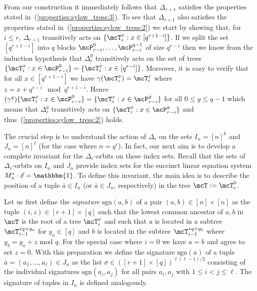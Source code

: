 \documentclass[a4paper,UKenglish]{lipics}
\newcommand{\defeq}{:=}
\newcommand{\inseg}[1]{\ensuremath{[#1]}}
\newcommand{\sgn}{\ensuremath{\textrm{sgn}}}
\newcommand{\modulo}{\ensuremath{\text{mod }}}
\newcommand{\onevec}{\ensuremath{\mathbbm{1}}}
\newcommand{\ba}{{\bar a}}
\theoremstyle{plain}
\begin{document}
\medskip
From our construction it immediately follows that $\Delta_{r+1}$ satisfies the
properties stated in~(\ref{properties:sylow_tress:3}). To see that
$\Delta_{r+1}$ also satisfies the properties stated
in~(\ref{properties:sylow_tress:2}) we start by showing that, for $i \leq r$, 
$\Delta_{r+1}$ transitively acts on $\{\mcT_i^x : x \in \inseg {q^{r+1-i}} \}$.
If we split the set $\inseg {q^{r+1-i}}$  
into $q$ blocks $\mcP_{r-i}^0, \dots, \mcP_{r-i}^{q-1}$ of size $q^{r-i}$
then we know from the induction hypothesis that $\Delta_{r}^0$ transitively
acts on the set of trees $\{ \mcT_i^x : x \in \mcP_{r-i}^0 \} = \{
\mcT_i^x : x \in \inseg {q^{r-i}} \}$. 
Moreover, it is easy to verify that for all $x \in \inseg{q^{r+1-i}}$ we have
$\gamma(\mcT_i^x) = \mcT_i^z$ where $z = {x + q^{r-i} \mod q^{r+1-i}}$.
Hence $(\gamma^y) \{ \mcT_i^x : x \in \mcP_{r-i}^0 \} = \{ \mcT_i^x : x \in
\mcP_{r-i}^y \}$ for all $0 \leq y \leq q-1$ which means that
$\Delta_r^y$ transitively acts on $\{ \mcT_i^x : x \in \mcP_{r-i}^y \}$ and
thus~(\ref{properties:sylow_tress:2}) holds.


\bigskip
The crucial step is to understand the action of $\Delta_r$
on the sets $I_n = \inseg {n}^k$ and $J_n= \inseg{n}^\ell$ (for the case where 
$n = q^r$).
In fact, our next aim is to develop a complete invariant for 
the $\Delta_r$-orbits on these index sets. Recall that the sets 
of $\Delta_r$-orbits on $I_n$ and $J_n$ provide index sets for 
the succinct linear equation system 
$M_n^* \cdot \vec x = \onevec$.
To define this invariant, the main idea is to describe the position 
of a tuple $\ba \in I_n$ (or $\ba \in J_n$, respectively) in the tree 
$\mcT \defeq \mcT^0_r$.

Let us first define the \emph{signature} $\sgn(a,b)$ of a pair $(a,b) \in 
\inseg{n} \times \inseg{n}$ as the tuple $(i, z) \in \inseg{r+1} \times 
\inseg q$ such that the lowest common ancestor of $a, b$ in $\mcT$ is the 
root of a tree $\mcT^x_i$ and  such that $a$ is located in a subtree 
$\mcT_{i-1}^{xq + y_a}$ for $y_a \in \inseg q$ and $b$ is located in the 
subtree $\mcT_{i-1}^{xq + y_b}$ where $y_b = y_a + z \,\,\modulo q$. For the 
special case where $i=0$ we have $a = b$ and agree to set $z=0$. With this 
preparation we define the signature $\sgn(\ba)$ of a tuple $\ba = (a_1, 
\dots, a_\ell) \in J_n$ as the list $\sigma \in (\inseg{r+1} \times 
\inseg q)^{\ell (\ell -1) / 2}$ consisting of the individual signatures 
$\sgn(a_i,a_j)$ for all pairs $a_i, a_j$ with $1 \leq i < j \leq \ell$.
The signature of tuples in $I_n$ is defined analogously.
\end{document}

